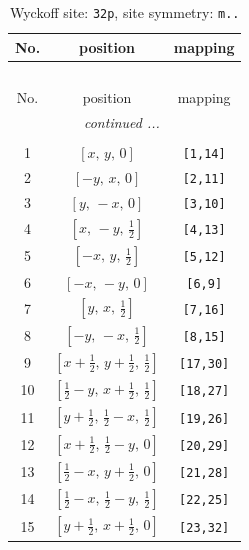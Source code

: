 \documentclass[fleqn,8pt]{jsarticle}
\begin{document}
\renewcommand{\arraystretch}{1.2}
\begin{longtable}{ccc}
\caption{Wyckoff site: {\tt 32p}, site symmetry: {\tt m..}}
 \\
 \hline \hline
No. & position & mapping \\ \hline \endfirsthead

\multicolumn{2}{l}{\tablename\ \thetable{}} \\
 \hline \hline
No. & position & mapping \\ \hline \endhead

 \hline \hline
\multicolumn{2}{r}{\footnotesize\it continued ...} \\ \endfoot

 \hline \hline
\multicolumn{2}{r}{} \\ \endlastfoot

1 & $\left[ x,\, y,\, 0 \right]$ & {\tt [1,14]} \\ \hline
2 & $\left[ - y,\, x,\, 0 \right]$ & {\tt [2,11]} \\ \hline
3 & $\left[ y,\, - x,\, 0 \right]$ & {\tt [3,10]} \\ \hline
4 & $\left[ x,\, - y,\, \frac{1}{2} \right]$ & {\tt [4,13]} \\ \hline
5 & $\left[ - x,\, y,\, \frac{1}{2} \right]$ & {\tt [5,12]} \\ \hline
6 & $\left[ - x,\, - y,\, 0 \right]$ & {\tt [6,9]} \\ \hline
7 & $\left[ y,\, x,\, \frac{1}{2} \right]$ & {\tt [7,16]} \\ \hline
8 & $\left[ - y,\, - x,\, \frac{1}{2} \right]$ & {\tt [8,15]} \\ \hline
9 & $\left[ x + \frac{1}{2},\, y + \frac{1}{2},\, \frac{1}{2} \right]$ & {\tt [17,30]} \\ \hline
10 & $\left[ \frac{1}{2} - y,\, x + \frac{1}{2},\, \frac{1}{2} \right]$ & {\tt [18,27]} \\ \hline
11 & $\left[ y + \frac{1}{2},\, \frac{1}{2} - x,\, \frac{1}{2} \right]$ & {\tt [19,26]} \\ \hline
12 & $\left[ x + \frac{1}{2},\, \frac{1}{2} - y,\, 0 \right]$ & {\tt [20,29]} \\ \hline
13 & $\left[ \frac{1}{2} - x,\, y + \frac{1}{2},\, 0 \right]$ & {\tt [21,28]} \\ \hline
14 & $\left[ \frac{1}{2} - x,\, \frac{1}{2} - y,\, \frac{1}{2} \right]$ & {\tt [22,25]} \\ \hline
15 & $\left[ y + \frac{1}{2},\, x + \frac{1}{2},\, 0 \right]$ & {\tt [23,32]} \\ \hline

\end{longtable}
\end{document}
